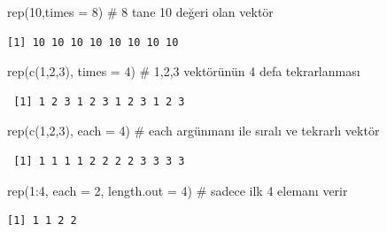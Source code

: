 \documentclass[
  letterpaper,
  DIV=11,
  numbers=noendperiod]{scrreprt}
\newenvironment{Shaded}{\begin{snugshade}}{\end{snugshade}}
\newcommand{\AttributeTok}[1]{\textcolor[rgb]{0.40,0.45,0.13}{#1}}
\newcommand{\CommentTok}[1]{\textcolor[rgb]{0.37,0.37,0.37}{#1}}
\newcommand{\DecValTok}[1]{\textcolor[rgb]{0.68,0.00,0.00}{#1}}
\newcommand{\FunctionTok}[1]{\textcolor[rgb]{0.28,0.35,0.67}{#1}}
\newcommand{\NormalTok}[1]{\textcolor[rgb]{0.00,0.23,0.31}{#1}}
\newcommand{\SpecialCharTok}[1]{\textcolor[rgb]{0.37,0.37,0.37}{#1}}
\begin{document}
\begin{Shaded}
\begin{Highlighting}[]
\FunctionTok{rep}\NormalTok{(}\DecValTok{10}\NormalTok{,}\AttributeTok{times =} \DecValTok{8}\NormalTok{) }\CommentTok{\# 8 tane 10 değeri olan vektör}
\end{Highlighting}
\end{Shaded}

\begin{verbatim}
[1] 10 10 10 10 10 10 10 10
\end{verbatim}

\begin{Shaded}
\begin{Highlighting}[]
\FunctionTok{rep}\NormalTok{(}\FunctionTok{c}\NormalTok{(}\DecValTok{1}\NormalTok{,}\DecValTok{2}\NormalTok{,}\DecValTok{3}\NormalTok{), }\AttributeTok{times =} \DecValTok{4}\NormalTok{) }\CommentTok{\# 1,2,3 vektörünün 4 defa tekrarlanması}
\end{Highlighting}
\end{Shaded}

\begin{verbatim}
 [1] 1 2 3 1 2 3 1 2 3 1 2 3
\end{verbatim}

\begin{Shaded}
\begin{Highlighting}[]
\FunctionTok{rep}\NormalTok{(}\FunctionTok{c}\NormalTok{(}\DecValTok{1}\NormalTok{,}\DecValTok{2}\NormalTok{,}\DecValTok{3}\NormalTok{), }\AttributeTok{each =} \DecValTok{4}\NormalTok{) }\CommentTok{\# each argünmanı ile sıralı ve tekrarlı vektör}
\end{Highlighting}
\end{Shaded}

\begin{verbatim}
 [1] 1 1 1 1 2 2 2 2 3 3 3 3
\end{verbatim}

\begin{Shaded}
\begin{Highlighting}[]
\FunctionTok{rep}\NormalTok{(}\DecValTok{1}\SpecialCharTok{:}\DecValTok{4}\NormalTok{, }\AttributeTok{each =} \DecValTok{2}\NormalTok{, }\AttributeTok{length.out =} \DecValTok{4}\NormalTok{) }\CommentTok{\# sadece ilk 4 elemanı verir}
\end{Highlighting}
\end{Shaded}

\begin{verbatim}
[1] 1 1 2 2
\end{verbatim}
\end{document}
